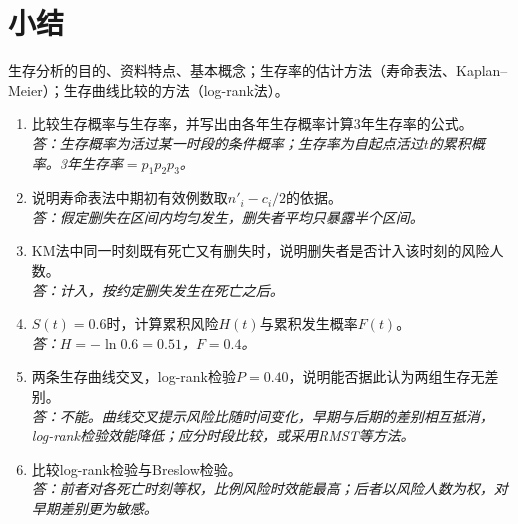 \section*{小结}
生存分析的目的、资料特点、基本概念；生存率的估计方法（寿命表法、Kaplan--Meier）；生存曲线比较的方法（log-rank法）。

\begin{fuxi}[复习题]
\begin{enumerate}
\item 比较生存概率与生存率，并写出由各年生存概率计算3年生存率的公式。\\
\textit{答：生存概率为活过某一时段的条件概率；生存率为自起点活过$t$的累积概率。3年生存率$=p_1p_2p_3$。}
\item 说明寿命表法中期初有效例数取$n'_i-c_i/2$的依据。\\
\textit{答：假定删失在区间内均匀发生，删失者平均只暴露半个区间。}
\item KM法中同一时刻既有死亡又有删失时，说明删失者是否计入该时刻的风险人数。\\
\textit{答：计入，按约定删失发生在死亡之后。}
\item $S(t)=0.6$时，计算累积风险$H(t)$与累积发生概率$F(t)$。\\
\textit{答：$H=-\ln0.6=0.51$，$F=0.4$。}
\item 两条生存曲线交叉，log-rank检验$P=0.40$，说明能否据此认为两组生存无差别。\\
\textit{答：不能。曲线交叉提示风险比随时间变化，早期与后期的差别相互抵消，log-rank检验效能降低；应分时段比较，或采用RMST等方法。}
\item 比较log-rank检验与Breslow检验。\\
\textit{答：前者对各死亡时刻等权，比例风险时效能最高；后者以风险人数为权，对早期差别更为敏感。}
\end{enumerate}
\end{fuxi}
